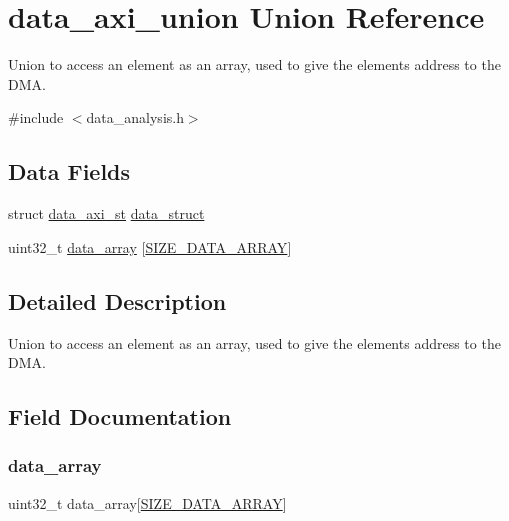 \hypertarget{uniondata__axi__union}{}\section{data\+\_\+axi\+\_\+union Union Reference}
\label{uniondata__axi__union}


Union to access an element as an array, used to give the element\textquotesingle{}s address to the D\+MA.  




{\ttfamily \#include $<$data\+\_\+analysis.\+h$>$}

\subsection*{Data Fields}
\begin{DoxyCompactItemize}
\item 
struct \mbox{\hyperlink{structdata__axi__st}{data\+\_\+axi\+\_\+st}} \mbox{\hyperlink{uniondata__axi__union_a36277ea8982d2b019ca86fef2b800a7b}{data\+\_\+struct}}
\item 
uint32\+\_\+t \mbox{\hyperlink{uniondata__axi__union_a3d25c878d42be1e014f8ee5e7691f154}{data\+\_\+array}} \mbox{[}\mbox{\hyperlink{data__analysis_8h_a5b5489121e775d682c51df031dc5cce1}{S\+I\+Z\+E\+\_\+\+D\+A\+T\+A\+\_\+\+A\+R\+R\+AY}}\mbox{]}
\end{DoxyCompactItemize}


\subsection{Detailed Description}
Union to access an element as an array, used to give the element\textquotesingle{}s address to the D\+MA. 

\subsection{Field Documentation}
\mbox{\label{uniondata__axi__union_a3d25c878d42be1e014f8ee5e7691f154}} 
\subsubsection{\texorpdfstring{data\_array}{data\_array}}
{\footnotesize\ttfamily uint32\+\_\+t data\+\_\+array\mbox{[}\mbox{\hyperlink{data__analysis_8h_a5b5489121e775d682c51df031dc5cce1}{S\+I\+Z\+E\+\_\+\+D\+A\+T\+A\+\_\+\+A\+R\+R\+AY}}\mbox{]}}

